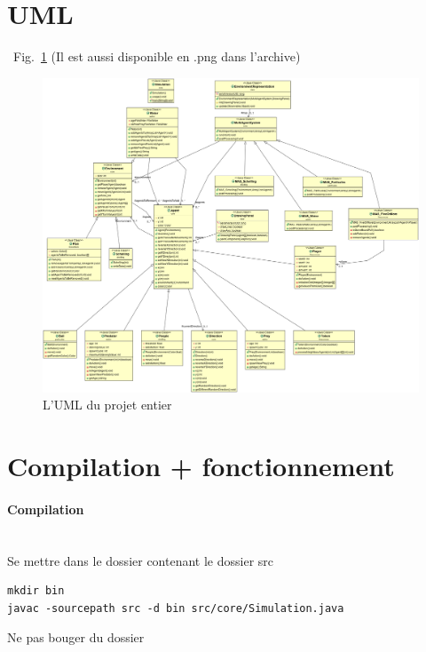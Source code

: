 \documentclass[a4paper,10pt]{article}
\begin{document}
\section{UML}

~Fig.~\ref{uml} (Il est aussi disponible en .png dans l'archive)

\begin{figure}[ht]
\begin{center}
	\includegraphics[width=17cm]{images/uml_tp3}
\end{center}
	\caption{L'UML du projet entier}
	\label{uml}
\end{figure}


\section{Compilation + fonctionnement}
 
\paragraph{Compilation} ~\\

Se mettre dans le dossier contenant le dossier src

\begin{Verbatim}[commandchars=\\\{\}]
mkdir bin
javac -sourcepath src -d bin src/core/Simulation.java
\end{Verbatim}

Ne pas bouger du dossier 
\end{document}

